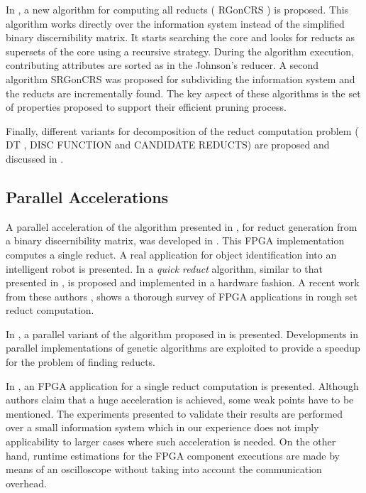 \documentclass[citenumber]{llncs}
\makeatletter
\newcommand{\setword}[2]{%
  \phantomsection
  #1\def\@currentlabel{\unexpanded{#1}}\label{#2}%
}
\makeatother
\begin{document}
    In \cite{WangP07}, a new algorithm for computing all reducts (\setword{RGonCRS}{RGonCRS}) is proposed. This algorithm works directly over the information system instead of the simplified binary discernibility matrix. It starts searching the core and looks for reducts as supersets of the core using  a recursive strategy. During the algorithm execution, contributing attributes are sorted as in the Johnson's reducer. A second algorithm \setword{SRGonCRS}{SRGonCRS} was proposed for subdividing the information system and the reducts are incrementally found. The key aspect of these algorithms is the set of properties proposed to support their efficient pruning process.
    
    Finally, different variants for decomposition of the reduct computation problem  (\setword{DT}{DT}, DISC FUNCTION and CANDIDATE REDUCTS) are proposed and discussed in \cite{Strakowski08}.
  
  \subsection{Parallel Accelerations}
  
    A parallel acceleration of the algorithm presented in \cite{Yang08}, for reduct generation from a binary
    discernibility matrix, was developed in \cite{Tiwari11,Tiwari12}. This FPGA implementation computes a 
    single reduct. A real application for object identification into an intelligent robot is presented.
    In \cite{Tiwari13} a \emph{quick reduct} algorithm, similar to that presented in \cite{Chouchoulas01}, 
    is proposed and implemented in a hardware fashion. A recent work from these authors \cite{Tiwari14}, 
    shows a thorough survey of FPGA applications in rough set reduct computation.
 
    In \cite{Wroblewski98}, a parallel variant of the algorithm proposed in \cite{Wroblewski95} is presented.
    Developments in parallel implementations of genetic algorithms are exploited to provide a speedup for the 
    problem of finding reducts.
    
    In \cite{Grzes13,Kopczynski14}, an FPGA application for a single reduct computation is presented. Although authors claim that a huge acceleration is achieved, some weak points have to be mentioned. The experiments presented \cite{Kopczynski14} to validate their results are performed over a small information system which in our experience does not imply applicability to larger cases where such acceleration is needed. On the other hand, runtime estimations for the FPGA component executions are made by means of an oscilloscope without taking into account the communication overhead.
    
\end{document}
